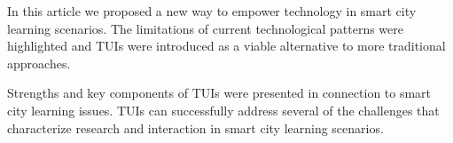 In this article we proposed a new way to empower technology in smart city learning scenarios. The limitations of current technological patterns were highlighted and TUIs were introduced as a viable alternative to more traditional approaches.

Strengths and key components of TUIs were presented in connection to smart city learning issues.
TUIs can successfully address several of the challenges that characterize research and interaction in smart city learning scenarios.